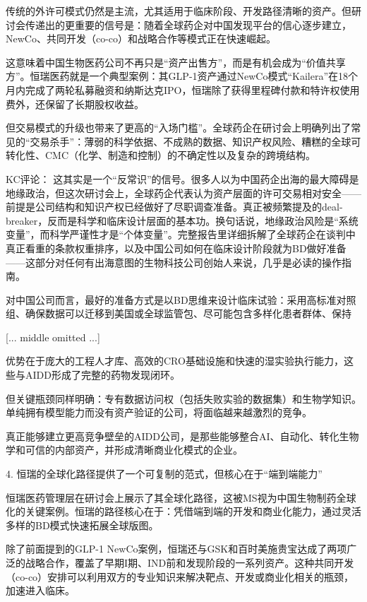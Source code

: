 \documentclass[11pt]{ctexart}
\begin{document}
传统的外许可模式仍然是主流，尤其适用于临床阶段、开发路径清晰的资产。但研讨会传递出的更重要的信号是：随着全球药企对中国发现平台的信心逐步建立，NewCo、共同开发（co-co）和战略合作等模式正在快速崛起。

这意味着中国生物医药公司不再只是“资产出售方”，而是有机会成为“价值共享方”。恒瑞医药就是一个典型案例：其GLP-1资产通过NewCo模式“Kailera”在18个月内完成了两轮私募融资和纳斯达克IPO，恒瑞除了获得里程碑付款和特许权使用费外，还保留了长期股权收益。

但交易模式的升级也带来了更高的“入场门槛”。全球药企在研讨会上明确列出了常见的“交易杀手”：薄弱的科学依据、不成熟的数据、知识产权风险、糟糕的全球可转化性、CMC（化学、制造和控制）的不确定性以及复杂的跨境结构。

KC评论： 这其实是一个“反常识”的信号。很多人以为中国药企出海的最大障碍是地缘政治，但这次研讨会上，全球药企代表认为资产层面的许可交易相对安全——前提是公司结构和知识产权已经做好了尽职调查准备。真正被频繁提及的deal-breaker，反而是科学和临床设计层面的基本功。换句话说，地缘政治风险是“系统变量”，而科学严谨性才是“个体变量”。完整报告里详细拆解了全球药企在谈判中真正看重的条款权重排序，以及中国公司如何在临床设计阶段就为BD做好准备——这部分对任何有出海意图的生物科技公司创始人来说，几乎是必读的操作指南。

对中国公司而言，最好的准备方式是以BD思维来设计临床试验：采用高标准对照组、确保数据可以迁移到美国或全球监管包、尽可能包含多样化患者群体、保持

[... middle omitted ...]

优势在于庞大的工程人才库、高效的CRO基础设施和快速的湿实验执行能力，这些与AIDD形成了完整的药物发现闭环。

但关键瓶颈同样明确：专有数据访问权（包括失败实验的数据集）和生物学知识。单纯拥有模型能力而没有资产验证的公司，将面临越来越激烈的竞争。

真正能够建立更高竞争壁垒的AIDD公司，是那些能够整合AI、自动化、转化生物学和可信的内部资产，并形成清晰商业化模式的企业。

4. 恒瑞的全球化路径提供了一个可复制的范式，但核心在于“端到端能力”

恒瑞医药管理层在研讨会上展示了其全球化路径，这被MS视为中国生物制药全球化的关键案例。恒瑞的路径核心在于：凭借端到端的开发和商业化能力，通过灵活多样的BD模式快速拓展全球版图。

除了前面提到的GLP-1 NewCo案例，恒瑞还与GSK和百时美施贵宝达成了两项广泛的战略合作，覆盖了早期I期、IND前和发现阶段的一系列资产。这种共同开发（co-co）安排可以利用双方的专业知识来解决靶点、开发或商业化相关的瓶颈，加速进入临床。
\end{document}

